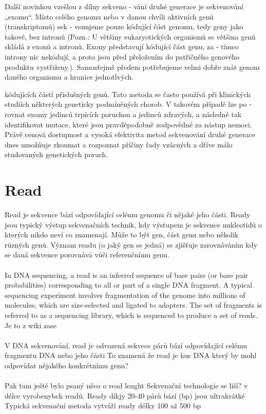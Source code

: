 \documentclass[czech,DP]{thesiskiv}
\begin{document}
Další novinkou vzešlou z dílny sekveno -
vání druhé generace je sekvenování „exomu“. Místo celého genomu nebo v danou
chvíli aktivních genů (transkriptomů) sek -
venujeme pouze kódující část genomu,
tedy geny jako takové, bez intronů (Pozn.:
U většiny eukaryotických organismů se
většina genů skládá z exonů a intronů.
Exony představují kódující část genu, za -
tímco introny nic nekódují, a proto jsou
před přeložením do patřičného genového
produktu vystřiženy.). Samozřejmě předem potřebujeme velmi dobře znát genom
daného organismu a hranice jednotlvých.


kódujících částí příslušných genů. Tato
metoda se často používá při klinických
studiích některých geneticky podmíněných chorob. V takovém případě lze po -
rovnat exomy jedinců trpících poruchou
a jedinců zdravých, a následně tak identifikovat mutace, které jsou pravděpodobně zodpovědné za nástup nemoci. Právě
cenová dostupnost a vysoká efektivita
metod sekvenování druhé generace dnes
umožňuje zkoumat a rozpoznat příčiny
řady vzácných a dříve málo studovaných
genetických poruch.
\section{Read}
Read je sekvence bází odpovídající celému genomu či nějaké jeho části. Ready jsou typický výstup sekvenačních technik, kdy výstupem je sekvence nukleotidů o kterých nikdo neví co znamenají. Může to být gen, část genu nebo několik různých genů. Význam readu (o jaký gen se jedná) se zjišťuje zarovnáváním kdy se daná sekvence porovnává vůči referenčnímu genu.  
\\
\\
In DNA sequencing, a read is an inferred sequence of base pairs (or base pair probabilities) corresponding to all or part of a single DNA fragment. A typical sequencing experiment involves fragmentation of the genome into millions of molecules, which are size-selected and ligated to adapters. The set of fragments is referred to as a sequencing library, which is sequenced to produce a set of reads. Je to z wiki zase
\\
\\
V DNA sekvenování, read je odvozená sekvece párů bází odpovídající celému fragmentu DNA nebo jeho části
To znamená že read je kus DNA který by mohl odpovídat nějakého konkrétnímu genu? 
\\
\\
Pak tam ještě bylo psaný něco o read lenght
Sekvenační technologie se liší? v délce vyrobenybch readů. 
Ready díkjy 20-40 párů bází (bp) jsou ultrakrátké
Typická sekvenační metoda vytváří ready délky 100 až 500 bp
\end{document}
